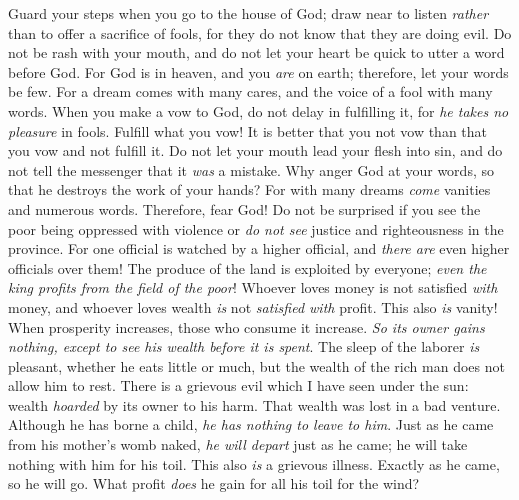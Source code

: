 \begin{biblechapter} %
  Guard your steps when you go to the house of God; 
draw near to listen \textit{rather} than to offer a sacrifice of fools, 
for they do not know that they are doing evil.
\verse Do not be rash with your mouth, 
and do not let your heart be quick to utter a word before God. 
For God is in heaven, and you \textit{are} on earth; 
therefore, let your words be few.
\verse For a dream comes with many cares, 
and the voice of a fool with many words.
\verse When you make a vow to God, 
do not delay in fulfilling it, 
for \textit{he takes no pleasure} in fools. 
Fulfill what you vow!
\verse It is better that you not vow 
than that you vow and not fulfill it.
\verse Do not let your mouth lead your flesh into sin, 
and do not tell the messenger that it \textit{was} a mistake. 
Why anger God at your words, 
so that he destroys the work of your hands?
\verse For with many dreams \textit{come} vanities and numerous words. 
Therefore, fear God!
 Do not be surprised if you see the poor being oppressed with violence 
or \textit{do not see} justice and righteousness in the province. 
For one official is watched by a higher official, 
and \textit{there are} even higher officials over them!
\verse The produce of the land is exploited by everyone; 
\textit{even the king profits from the field \textit{of the poor}}!
 Whoever loves money is not satisfied \textit{with} money, 
and whoever loves wealth \textit{is} not \textit{satisfied with} profit. 
This also \textit{is} vanity!
\verse When prosperity increases, 
those who consume it increase. 
\textit{So its owner gains nothing, 
except to see his wealth before it is spent}.
\verse The sleep of the laborer \textit{is} pleasant, whether he eats little or much, 
but the wealth of the rich man does not allow him to rest.
 There is a grievous evil which I have seen under the sun: wealth \textit{hoarded} by its owner to his harm.
\verse That wealth was lost in a bad venture. Although he has borne a child, \textit{he has nothing to leave to him}.
\verse Just as he came from his mother’s womb naked, \textit{he will depart} just as he came; he will take nothing with him for his toil.
\verse This also \textit{is} a grievous illness. Exactly as he came, so he will go. What profit \textit{does} he gain for all his toil for the wind?

\end{biblechapter}
